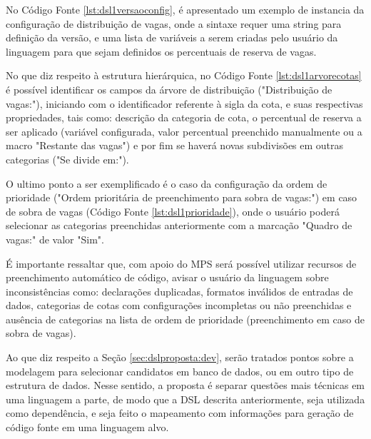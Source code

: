   No Código Fonte \ref{lst:dsl1versaoconfig}, é apresentado um exemplo de instancia da configuração de distribuição de vagas, onde a sintaxe requer uma string para definição da versão, e uma lista de variáveis a serem criadas pelo usuário da linguagem para que sejam definidos os percentuais de reserva de vagas.
   
   


No que diz respeito à estrutura hierárquica, no Código Fonte \ref{lst:dsl1arvorecotas} é possível identificar os campos da árvore de distribuição ("Distribuição de vagas:"), iniciando com o identificador referente à sigla da cota, e suas respectivas propriedades, tais como: descrição da categoria de cota, o percentual de reserva a ser aplicado (variável configurada, valor percentual preenchido manualmente ou a macro "Restante das vagas") e por fim se haverá novas subdivisões em outras categorias ("Se divide em:").

   


O ultimo ponto a ser exemplificado é o caso da configuração da ordem de prioridade ("Ordem prioritária de preenchimento para sobra de vagas:") em caso de sobra de vagas (Código Fonte \ref{lst:dsl1prioridade}), onde o usuário poderá selecionar as categorias preenchidas anteriormente com a marcação "Quadro de vagas:" de valor "Sim".  

   

É importante ressaltar que, com apoio do \gls{MPS} será possível utilizar recursos de preenchimento automático de código, avisar o usuário da linguagem sobre inconsistências como: declarações duplicadas, formatos inválidos de entradas de dados, categorias de cotas com configurações incompletas ou não preenchidas e ausência de categorias na lista de ordem de prioridade (preenchimento em caso de sobra de vagas). 

Ao que diz respeito a Seção \ref{sec:dslproposta:dev}, serão tratados pontos sobre a modelagem para selecionar candidatos em banco de dados, ou em outro tipo de estrutura de dados. Nesse sentido, a proposta é separar questões mais técnicas em uma linguagem a parte, de modo que a \gls{DSL} descrita anteriormente, seja utilizada como dependência, e seja feito o mapeamento com informações para geração de código fonte em uma linguagem alvo.